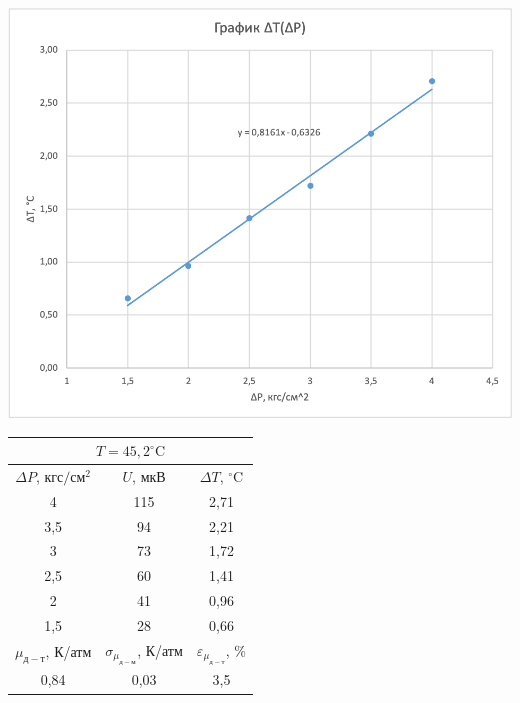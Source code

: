 \documentclass[a4paper, 12pt]{article}
\begin{document}
\begin{table}[pt]
        \vspace{0.5cm}
        
        \begin{minipage}[ht]{0.55\linewidth}
            \includegraphics[width=\linewidth]{images/ch6.png}
        \end{minipage}
        \hfill
        \begin{minipage}[ht]{0.47\linewidth}
            \begin{tabular}{|c|c|c|}
                \hline
                \multicolumn{3}{|c|}{$T = 45,2^{\circ}\text{C}$} \\
                \hline
                $\Delta P$, $кгс/см^2$ & $U$, $мкВ$ & $\Delta T$, $^{\circ}\text{C}$ \\
                \hline
                4 & 115 & 2,71 \\
                \hline
                3,5 & 94 & 2,21 \\
                \hline
                3 & 73 & 1,72 \\
                \hline
                2,5 & 60 & 1,41 \\
                \hline
                2 & 41 & 0,96 \\
                \hline
                1,5 & 28 & 0,66 \\
                \hline
                $\mu_{д-т}$, К/атм & $\sigma_{\mu_{д-м}}$, К/атм & $\varepsilon_{\mu_{д-т}}$, \% \\
                \hline
                0,84 & 0,03 & 3,5 \\
                \hline
            \end{tabular}
        \end{minipage}
        
    \end{table}
    
\end{document}
